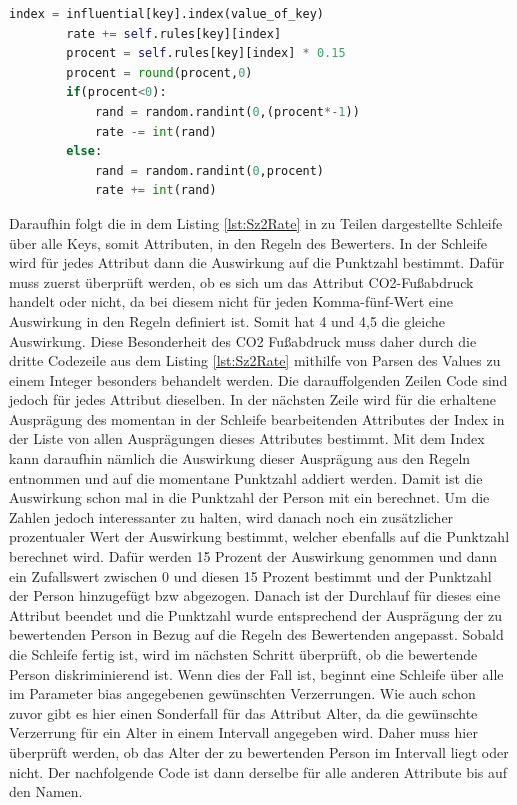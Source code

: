 \begin{onehalfspace}
\begin{lstlisting}[language=Python,label={lst:Sz2Rate},caption=Codeausschnitt der Funktion zum Bewerten von Personen]
        index = influential[key].index(value_of_key)
        rate += self.rules[key][index]
        procent = self.rules[key][index] * 0.15
        procent = round(procent,0)
        if(procent<0):
            rand = random.randint(0,(procent*-1))
            rate -= int(rand)
        else:
            rand = random.randint(0,procent)
            rate += int(rand)
\end{lstlisting}
Daraufhin folgt die in dem Listing \ref{lst:Sz2Rate} in zu Teilen dargestellte Schleife über alle Keys, somit Attributen, in den Regeln des Bewerters. In der Schleife wird für jedes Attribut dann die Auswirkung auf die Punktzahl bestimmt. Dafür muss zuerst überprüft werden, ob es sich um das Attribut CO2-Fußabdruck handelt oder nicht, da bei diesem nicht für jeden Komma-fünf-Wert eine Auswirkung in den Regeln definiert ist. Somit hat 4 und 4,5 die gleiche Auswirkung. Diese Besonderheit des CO2 Fußabdruck muss daher durch die dritte Codezeile aus dem Listing \ref{lst:Sz2Rate} mithilfe von Parsen des Values zu einem Integer besonders behandelt werden. Die darauffolgenden Zeilen Code sind jedoch für jedes Attribut dieselben. In der nächsten Zeile wird für die erhaltene Ausprägung des momentan in der Schleife bearbeitenden Attributes der Index in der Liste von allen Ausprägungen dieses Attributes bestimmt. Mit dem Index kann daraufhin nämlich die Auswirkung dieser Ausprägung aus den Regeln entnommen und auf die momentane Punktzahl addiert werden. Damit ist die Auswirkung schon mal in die Punktzahl der Person mit ein berechnet. Um die Zahlen jedoch interessanter zu halten, wird danach noch ein zusätzlicher prozentualer Wert der Auswirkung bestimmt, welcher ebenfalls auf die Punktzahl berechnet wird. Dafür werden 15 Prozent der Auswirkung genommen und dann ein Zufallswert zwischen 0 und diesen 15 Prozent bestimmt und der Punktzahl der Person hinzugefügt \ac{bzw} abgezogen. Danach ist der Durchlauf für dieses eine Attribut beendet und die Punktzahl wurde entsprechend der Ausprägung der zu bewertenden Person in Bezug auf die Regeln des Bewertenden angepasst. Sobald die Schleife fertig ist, wird im nächsten Schritt überprüft, ob die bewertende Person diskriminierend ist. Wenn dies der Fall ist, beginnt eine Schleife über alle im Parameter \glqq{}bias\grqq{} angegebenen gewünschten Verzerrungen. Wie auch schon zuvor gibt es hier einen Sonderfall für das Attribut Alter, da die gewünschte Verzerrung für ein Alter in einem Intervall angegeben wird. Daher muss hier überprüft werden, ob das Alter der zu bewertenden Person im Intervall liegt oder nicht. Der nachfolgende Code ist dann derselbe für alle anderen Attribute bis auf den Namen.

\end{onehalfspace}
